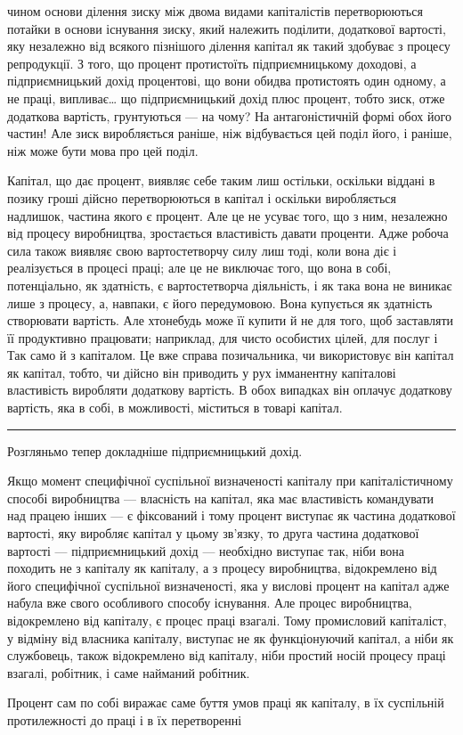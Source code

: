 \parcont{}  %
чином основи ділення зиску між двома видами капіталістів перетворюються
потайки в основи існування зиску, який належить
поділити, додаткової вартості, яку незалежно від всякого пізнішого
ділення капітал як такий здобуває з процесу репродукції.
З того, що процент протистоїть підприємницькому доходові, а
підприємницький дохід процентові, що вони обидва протистоять
один одному, а не праці, випливає\dots{} що підприємницький дохід
плюс процент, тобто зиск, отже додаткова вартість, грунтуються
— на чому? На антагоністичній формі обох його частин!
Але зиск виробляється раніше, ніж відбувається цей поділ його,
і раніше, ніж може бути мова про цей поділ.

Капітал, що дає процент, виявляє себе таким лиш остільки,
оскільки віддані в позику гроші дійсно перетворюються в капітал
і оскільки виробляється надлишок, частина якого є процент.
Але це не усуває того, що з ним, незалежно від процесу виробництва,
зростається властивість давати проценти. Адже робоча
сила також виявляє свою вартостетворчу силу лиш тоді, коли
вона діє і реалізується в процесі праці; але це не виключає того,
що вона в собі, потенціально, як здатність, є вартостетворча
діяльність, і як така вона не виникає лише з процесу, а, навпаки,
є його передумовою. Вона купується як здатність створювати
вартість. Але хтонебудь може її купити й не для того, щоб заставляти
її продуктивно працювати; наприклад, для чисто особистих
цілей, для послуг і~ Так само й з капіталом. Це вже справа
позичальника, чи використовує він капітал як капітал, тобто,
чи дійсно він приводить у рух імманентну капіталові властивість
виробляти додаткову вартість. В обох випадках він оплачує
додаткову вартість, яка в собі, в можливості, міститься в товарі
капітал.

\pfbreak

\noindent{}
Розгляньмо тепер докладніше підприємницький дохід.

Якщо момент специфічної суспільної визначеності капіталу
при капіталістичному способі виробництва — власність на капітал,
яка має властивість командувати над працею інших — є фіксований
і тому процент виступає як частина додаткової вартості, яку
виробляє капітал у цьому зв’язку, то друга частина додаткової
вартості — підприємницький дохід — необхідно виступає так, ніби
вона походить не з капіталу як капіталу, а з процесу виробництва,
відокремлено від його специфічної суспільної визначеності,
яка у вислові процент на капітал адже набула вже
свого особливого способу існування. Але процес виробництва,
відокремлено від капіталу, є процес праці взагалі. Тому промисловий
капіталіст, у відміну від власника капіталу, виступає не
як функціонуючий капітал, а ніби як службовець, також відокремлено
від капіталу, ніби простий носій процесу праці взагалі,
робітник, і саме найманий робітник.

Процент сам по собі виражає саме буття умов праці як капіталу,
в їх суспільній протилежності до праці і в їх перетворенні
\parbreak{}  %
